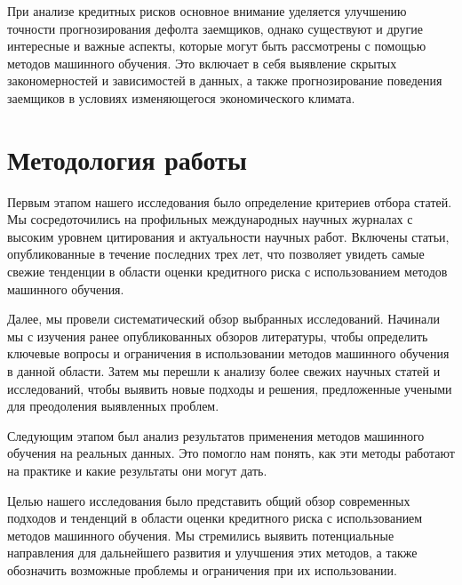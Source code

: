 \documentclass[14pt, letterpaper, twoside]{extarticle}
\begin{document}
 При анализе кредитных рисков основное внимание уделяется улучшению точности прогнозирования дефолта заемщиков, однако существуют и другие интересные и важные аспекты, которые могут быть рассмотрены с помощью методов машинного обучения. Это включает в себя выявление скрытых закономерностей и зависимостей в данных, а также прогнозирование поведения заемщиков в условиях изменяющегося экономического климата.


\section{Методология работы}
Первым этапом нашего исследования было определение критериев отбора статей. Мы сосредоточились на профильных международных научных журналах с высоким уровнем цитирования и актуальности научных работ. Включены статьи, опубликованные в течение последних трех лет, что позволяет увидеть самые свежие тенденции в области оценки кредитного риска с использованием методов машинного обучения.

Далее, мы провели систематический обзор выбранных исследований. Начинали мы с изучения ранее опубликованных обзоров литературы, чтобы определить ключевые вопросы и ограничения в использовании методов машинного обучения в данной области. Затем мы перешли к анализу более свежих научных статей и исследований, чтобы выявить новые подходы и решения, предложенные учеными для преодоления выявленных проблем.

Следующим этапом был анализ результатов применения методов машинного обучения на реальных данных. Это помогло нам понять, как эти методы работают на практике и какие результаты они могут дать.

Целью нашего исследования было представить общий обзор современных подходов и тенденций в области оценки кредитного риска с использованием методов машинного обучения. Мы стремились выявить потенциальные направления для дальнейшего развития и улучшения этих методов, а также обозначить возможные проблемы и ограничения при их использовании.
\end{document}
